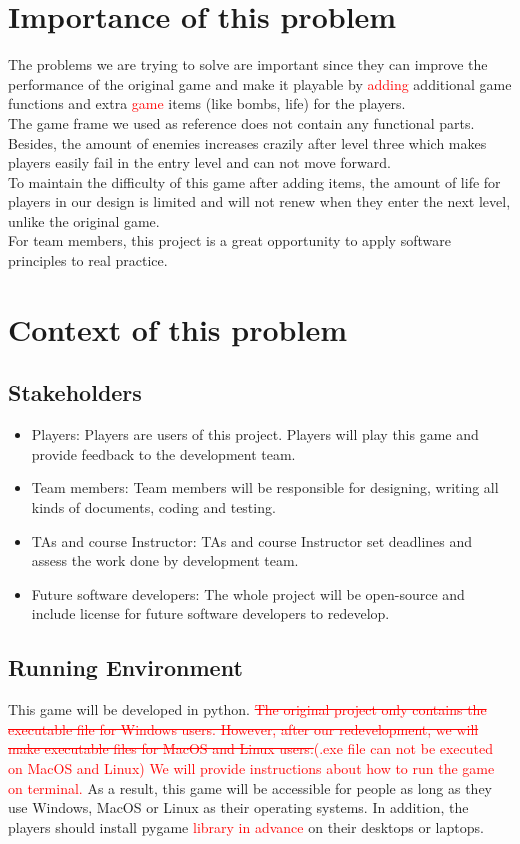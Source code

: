 \documentclass[12pt]{article}
\begin{document}
\section{Importance of this problem}
The problems we are trying to solve are important since they can improve the performance of the original game and make it playable by
\textcolor{red}{adding} additional game functions and extra \textcolor{red}{game} items (like bombs, life) for the players.\\ 
The game frame we used as reference does not contain any functional parts. Besides, the amount of enemies increases crazily after level three which makes players easily fail in the entry level and can not move forward.\\
To maintain the difficulty of this game after adding items, the amount of life for players in our design is limited and will not renew when they enter the next level, unlike the original game.\\
For team members, this project is a great opportunity to apply 
software principles to real practice. 

\section{Context of this problem}
\subsection{Stakeholders}
\begin{itemize}
\item Players: Players are users of this project. Players will play this game and provide feedback to the development team.
\item Team members: Team members will be responsible for designing,
writing all kinds of documents, coding and testing.
\item TAs and course Instructor: TAs and course Instructor set deadlines and assess the work done by development team.
\item Future software developers: The whole project will be open-source and include license for future software developers to
redevelop.
\end{itemize}
\subsection{Running Environment}
This game will be developed in python. \textcolor{red}{\st{The original project only contains the executable file for Windows users. However, after our redevelopment, we will make executable files for MacOS and Linux users.}(.exe file can not be executed on MacOS and Linux) We will provide instructions 
about how to run the game on terminal.} As a result, this game will be accessible for people as long as they use Windows, MacOS or Linux as their operating systems. In addition, the players should install pygame \textcolor{red}{library in advance} on their desktops or laptops.
\end{document}
